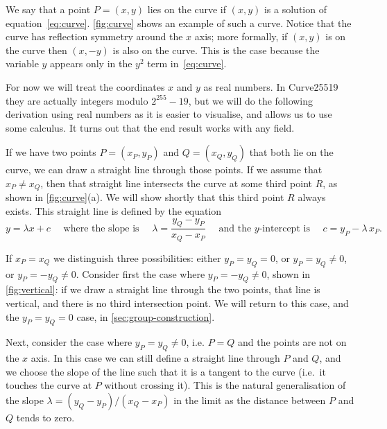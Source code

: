\documentclass[manuscript]{acmart}
\begin{document}
We say that a point $P = (x, y)$ lies on the curve if $(x, y)$ is a solution of equation~\eqref{eq:curve}.
\autoref{fig:curve} shows an example of such a curve.
Notice that the curve has reflection symmetry around the $x$ axis; more formally, if $(x, y)$ is on the curve then $(x, -y)$ is also on the curve.
This is the case because the variable $y$ appears only in the $y^2$ term in~\eqref{eq:curve}.

For now we will treat the coordinates $x$ and $y$ as real numbers.
In Curve25519 they are actually integers modulo $2^{255} - 19$, but we will do the following derivation using real numbers as it is easier to visualise, and allows us to use some calculus.
It turns out that the end result works with any field.

If we have two points $P=(x_P,y_P)$ and $Q=(x_Q,y_Q)$ that both lie on the curve, we can draw a straight line through those points.
If we assume that $x_P \neq x_Q$, then that straight line intersects the curve at some third point $R$, as shown in \autoref{fig:curve}(a).
We will show shortly that this third point $R$ always exists.
This straight line is defined by the equation
\begin{equation}
y = \lambda x + c \quad\text{ where the slope is }\quad
\lambda = \frac{y_Q - y_P}{x_Q - x_P} \quad\text{ and the $y$-intercept is }\quad c = y_P - \lambda\,x_P. \label{eq:line}
\end{equation}

If $x_P=x_Q$ we distinguish three possibilities: either $y_P=y_Q=0$, or $y_P=y_Q \ne 0$, or $y_P=-y_Q \ne 0$.
Consider first the case where $y_P=-y_Q \ne 0$, shown in \autoref{fig:vertical}: if we draw a straight line through the two points, that line is vertical, and there is no third intersection point.
We will return to this case, and the $y_P=y_Q=0$ case, in \autoref{sec:group-construction}.

Next, consider the case where $y_P=y_Q \ne 0$, i.e. $P=Q$ and the points are not on the $x$ axis.
In this case we can still define a straight line through $P$ and $Q$, and we choose the slope of the line such that it is a tangent to the curve (i.e.\ it touches the curve at $P$ without crossing it).
This is the natural generalisation of the slope $\lambda = (y_Q - y_P)/(x_Q - x_P)$ in the limit as the distance between $P$ and $Q$ tends to zero.
\end{document}
